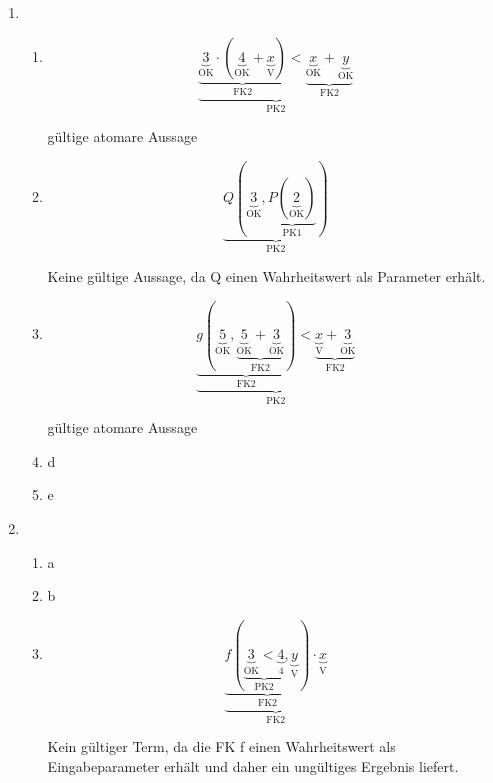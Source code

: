\documentclass[a4paper]{article}
\begin{document}
	\begin{enumerate}
		\item
		\begin{enumerate}
			\item
			\begin{equation*}
				\underbrace{\underbrace{\underbrace{3}_{\text{OK}} \cdot (\underbrace{4}_{\text{OK}} + \underbrace{x}_{\text{V}})}_{\text{FK2}} < \underbrace{\underbrace{x}_{\text{OK}} + \underbrace{y}_{\text{OK}}}_{\text{FK2}}}_{\text{PK2}}
			\end{equation*}
			\newline
			\begin{center}
				gültige atomare Aussage
			\end{center}
			
			\item
			\begin{equation*}
				\underbrace{Q(\underbrace{3}_{\text{OK}}, \underbrace{P(\underbrace{2}_{\text{OK}})}_{\text{PK1}})}_{\text{PK2}}
			\end{equation*}
			\newline
			\begin{center}
				Keine gültige Aussage, da Q einen Wahrheitswert als Parameter erhält.
			\end{center}
			
			\item
			\begin{equation*}
				\underbrace{\underbrace{g(\underbrace{5}_{\text{OK}}, \underbrace{\underbrace{5}_{\text{OK}} + \underbrace{3}_{\text{OK}}}_{\text{FK2}})}_{\text{FK2}} < \underbrace{\underbrace{x}_{\text{V}} + \underbrace{3}_{\text{OK}}}_{\text{FK2}}}_{\text{PK2}}
			\end{equation*}
			\begin{center}
				gültige atomare Aussage
			\end{center}
			
			\item d
			\item e
		\end{enumerate}
		
		\item
		\begin{enumerate}
			\item a
			\item b
						
			\item
			\begin{equation*}
				\underbrace{\underbrace{f(\underbrace{\underbrace{3}_{\text{OK}} < \underbrace{4}_{\text{4}}}_{\text{PK2}}, \underbrace{y}_{\text{V}})}_{\text{FK2}} \cdot \underbrace{x}_{\text{V}}}_{\text{FK2}}
			\end{equation*}
			\newline
			\begin{center}
				Kein gültiger Term, da die FK f einen Wahrheitswert als Eingabeparameter erhält und daher ein ungültiges Ergebnis liefert.
			\end{center}
			

\end{enumerate}
\end{enumerate}
\end{document}
